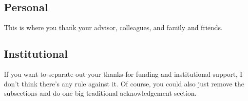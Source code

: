 
\subsection*{Personal}

This is where you thank your advisor, colleagues, and family and friends.

\subsection*{Institutional}

If you want to separate out your thanks for funding and institutional support, I don't think there's any rule against it.  Of course, you could also just remove the subsections and do one big traditional acknowledgement section.
